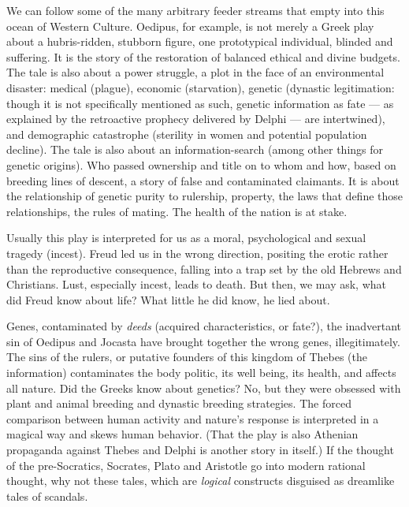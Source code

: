 We can follow some of the many arbitrary
feeder streams that empty into this ocean of
Western Culture. Oedipus, for example, is
not merely a Greek play about a hubris-ridden, stubborn figure, one prototypical
individual, blinded and suffering. It is the
story of the restoration of balanced ethical
and divine budgets. The tale is also about a
power struggle, a plot in the face of an
environmental disaster: medical (plague),
economic
(starvation), genetic (dynastic legitimation: though it is not specifically mentioned as such, genetic information as fate --- 
as explained by the retroactive prophecy
delivered by Delphi --- are intertwined), and
demographic catastrophe (sterility in women
and potential population decline). The tale
is also about an information-search (among
other things for genetic origins). Who passed
ownership and title on to whom and how,
based on breeding lines of descent, a story of
false and contaminated claimants. It is about
the relationship of genetic purity to rulership, property, the laws that define those
relationships, the rules of mating. The health
of the nation is at stake.

Usually this play is interpreted for us as a
moral, psychological and sexual tragedy (incest). Freud led us in the wrong direction,
positing the erotic rather than the reproductive consequence, falling into a trap set by
the old Hebrews and Christians. Lust, especially incest, leads to death. But then, we
may ask, what did Freud know about life?
What little he did know, he lied about.

Genes, contaminated by \emph{deeds} (acquired
characteristics, or fate?), the inadvertant sin
of Oedipus and Jocasta have brought together
the wrong genes, illegitimately. The sins of
the rulers, or putative founders of this kingdom of Thebes (the information) contaminates the body politic, its well being, its
health, and affects all nature. Did the Greeks
know about genetics? No, but they were
obsessed with plant and animal breeding
and dynastic breeding strategies. The forced
comparison between human activity and
nature's response is interpreted in a magical
way and skews human behavior. (That the
play is also Athenian propaganda against
Thebes and Delphi is another story in itself.)
If the thought of the pre-Socratics, Socrates,
Plato and Aristotle go into modern rational
thought, why not these tales, which are
\emph{logical} constructs disguised as dreamlike
tales of scandals.

